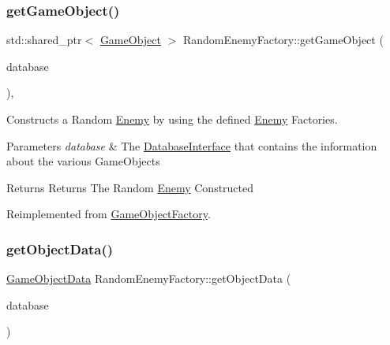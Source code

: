 \subsubsection{\texorpdfstring{get\+Game\+Object()}{getGameObject()}}
{\footnotesize\ttfamily std\+::shared\+\_\+ptr$<$ \hyperlink{class_game_object}{Game\+Object} $>$ Random\+Enemy\+Factory\+::get\+Game\+Object (\begin{DoxyParamCaption}\item[{const std\+::shared\+\_\+ptr$<$ \hyperlink{class_database_interface}{Database\+Interface} $>$ \&}]{database }\end{DoxyParamCaption})\hspace{0.3cm}{\ttfamily [override]}, {\ttfamily [virtual]}}



Constructs a Random \hyperlink{class_enemy}{Enemy} by using the defined \hyperlink{class_enemy}{Enemy} Factories. 


\begin{DoxyParams}{Parameters}
{\em database} & The \hyperlink{class_database_interface}{Database\+Interface} that contains the information about the various Game\+Objects \\
\hline
\end{DoxyParams}
\begin{DoxyReturn}{Returns}
Returns The Random \hyperlink{class_enemy}{Enemy} Constructed 
\end{DoxyReturn}


Reimplemented from \hyperlink{class_game_object_factory_a5b684a6e77fb82c041f1721eb07c553d}{Game\+Object\+Factory}.

\mbox{\label{class_random_enemy_factory_a7c007b44a5e5e59fecc0b8cd2a6a9dc3}} 
\subsubsection{\texorpdfstring{get\+Object\+Data()}{getObjectData()}}
{\footnotesize\ttfamily \hyperlink{struct_game_object_data}{Game\+Object\+Data} Random\+Enemy\+Factory\+::get\+Object\+Data (\begin{DoxyParamCaption}\item[{const std\+::shared\+\_\+ptr$<$ \hyperlink{class_database_interface}{Database\+Interface} $>$ \&}]{database }\end{DoxyParamCaption})\hspace{0.3cm}{\ttfamily [virtual]}}



